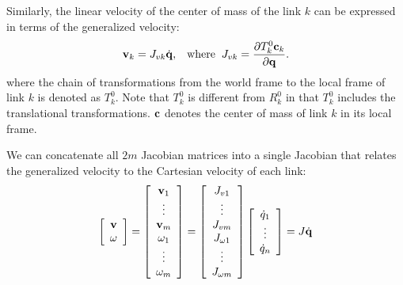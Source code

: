 
Similarly, the linear velocity of the center of mass of the link $k$
can be expressed in terms of the generalized velocity: 
\begin{equation}
\mathbf{v}_k = J_{vk} \dot{\mathbf{q}}, \;\;\;\mathrm{where}\;\; J_{vk} = \frac{\partial T^0_k
  \mathbf{c}_k}{\partial \mathbf{q}}.
\end{equation}
where the chain of transformations from the world frame to the local
frame of link $k$ is denoted as $T^0_k$. Note that $T^0_k$ is
different from $R^0_k$ in that $T^0_k$ includes the translational
transformations. $\mathbf{c}$ denotes the center of mass of link $k$ in
its local frame.

We can concatenate all $2m$  Jacobian matrices into a single Jacobian
that relates the generalized velocity to the Cartesian velocity of each
link:
\begin{equation}
\left[
\begin{array}{c}
\mathbf{v} \\
\omega \\
\end{array}
\right] =
\left[
\begin{array}{c}
\mathbf{v}_1 \\
\vdots \\
\mathbf{v}_m \\
\omega_1 \\
\vdots \\
\omega_m
\end{array}
\right] = 
\left[
\begin{array}{c}
J_{v1} \\
\vdots \\
J_{vm} \\
J_{\omega 1} \\
\vdots \\
J_{\omega m}
\end{array}
\right] 
\left[
\begin{array}{c}
\dot{q}_1\\
\vdots \\
\dot{q}_n
\end{array}
\right]  = J \dot{\mathbf{q}}
\end{equation}

